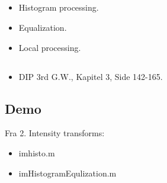 \subsection{\subtopics}

\begin{itemize}
	\item Histogram processing.
	\item Equalization.
	\item Local processing.
\end{itemize}

\subsection{\curriculum}

\begin{itemize}
	\item DIP 3rd G.W., Kapitel 3, Side 142-165.
\end{itemize}

\subsection{Demo}

Fra 2. Intensity transforms:

\begin{itemize}
	\item imhisto.m
	\item imHistogramEqulization.m
\end{itemize}
